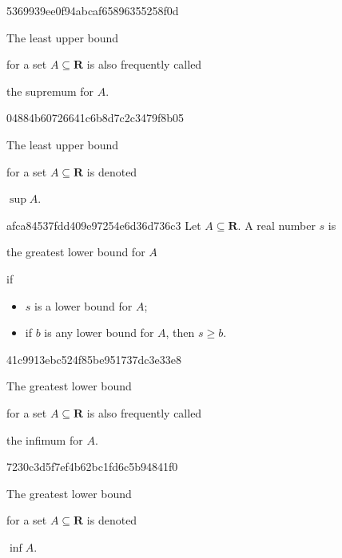 \begin{note}{5369939ee0f94abcaf65896355258f0d}
    \begin{icloze}{2}The least upper bound\end{icloze} for a set \({ A \subseteq \mathbf{R} }\) is also frequently called \begin{icloze}{1}the supremum for \({ A }\).\end{icloze}
\end{note}

\begin{note}{04884b60726641c6b8d7c2c3479f8b05}
    \begin{icloze}{2}The least upper bound\end{icloze} for a set \({ A \subseteq \mathbf{R} }\) is denoted \begin{icloze}{1}\({ \sup A }\).\end{icloze}
\end{note}

\begin{note}{afca84537fdd409e97254e6d36d736c3}
    Let \({ A \subseteq \mathbf{R} }\). A real number \({ s }\) is \begin{icloze}{3}the greatest lower bound for \({ A }\)\end{icloze} if
    \begin{itemize}
        \item{} \begin{icloze}{2}\({ s }\) is a lower bound for \({ A }\);\end{icloze}
        \item{} \begin{icloze}{1}if \({ b }\) is any lower bound for \({ A }\), then \({ s \geq b }\).\end{icloze}
    \end{itemize}
\end{note}

\begin{note}{41c9913ebc524f85be951737dc3e33e8}
    \begin{icloze}{2}The greatest lower bound\end{icloze} for a set \({ A \subseteq \mathbf{R} }\) is also frequently called \begin{icloze}{1}the infimum for \({ A }\).\end{icloze}
\end{note}

\begin{note}{7230c3d5f7ef4b62bc1fd6c5b94841f0}
    \begin{icloze}{2}The greatest lower bound\end{icloze} for a set \({ A \subseteq \mathbf{R} }\) is denoted \begin{icloze}{1}\({ \inf A }\).\end{icloze}
\end{note}

